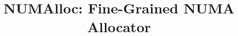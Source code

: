 \documentclass[sigplan,review,anonymous]{acmart}
\title{NUMAlloc: Fine-Grained NUMA  Allocator}
\begin{document}
\begin{abstract}

\end{abstract}

\maketitle
\thispagestyle{plain}
\pagestyle{plain}











\end{document}
